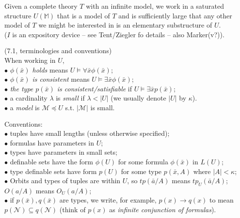 \documentclass[a4paper]{article}
\begin{document}
Given a complete theory $T$ with an infinite model, we work in a saturated structure $U(\mathbb{M})$ that is a model of $T$ and is sufficiently large that any other model of $T$ we might be interested in is an elementary substructure of $U$.\\
($I$ is an expository device -- see Tent/Ziegler fo details -- also Marker(v?)).

\begin{defi} (7.1, terminologies and conventions)\\
    When working in $U$, \\
    $\bullet$ \emph{$\phi(\bar{x})$ holds} means $U \vDash \forall \bar{x} \phi(\bar{x})$;\\
    $\bullet$ \emph{$\phi(\bar{x})$ is consistent} means $U\vDash \exists \bar{x} \phi(\bar{x})$;\\
    $\bullet$ \emph{the type $p(\bar{x})$ is consistent/satisfiable} if $U \vDash \exists \bar{x} p(\bar{x})$;\\
    $\bullet$ a cardinality $\lambda$ is \emph{small} if $\lambda < |U|$ (we usually denote $|U|$ by $\kappa$).\\
    $\bullet$ a \emph{model} is $\mathcal{M} \preccurlyeq U$ s.t. $|\mathcal{M}|$ is small.

    Conventions:\\
    $\bullet$ tuples have small lengths (unless otherwise specified);\\
    $\bullet$ formulas have parameters in $U$;\\
    $\bullet$ types have parameters in small sets;\\
    $\bullet$ definable sets have the form $\phi(U)$ for some formula $\phi(\bar{x})$ in $L(U)$;\\
    $\bullet$ type definable sets have form $p(U)$ for some type $p(\bar{x},A)$ where $|A| < \kappa$;\\
    $\bullet$ Orbits and types of tuples are within $U$, so $tp(\bar{a}/A)$ means $tp_U(\bar{a}/A)$; $O(a/A)$ means $O_U(a/A)$;\\
    $\bullet$ if $p(\bar{x}),q(\bar{x})$ are types, we write, for example, $p(x) \to q(x)$ to mean $p(\mathcal{N}) \subseteq q(\mathcal{N})$ (think of $p(x)$ as \emph{infinite conjunction of formulas}).
\end{defi}
\end{document}
